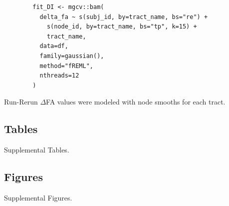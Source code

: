 \documentclass[12pt]{article}
\begin{document}
\begin{equ}[H]
	\begin{lstlisting}
		fit_DI <- mgcv::bam(
		  delta_fa ~ s(subj_id, by=tract_name, bs="re") +
		    s(node_id, by=tract_name, bs="tp", k=15) +
		    tract_name,
		  data=df,
		  family=gaussian(),
		  method="fREML",
		  nthreads=12
		)
	\end{lstlisting}
	\caption{Run-Rerun $\Delta$FA values were modeled with node smooths for each tract.}
	\label{supp-code:gam-di}
\end{equ}

\subsection{Tables}
\label{ssec:supp-tables}
Supplemental Tables.


\subsection{Figures}
\label{ssec:supp-figures}
Supplemental Figures.
\end{document}
